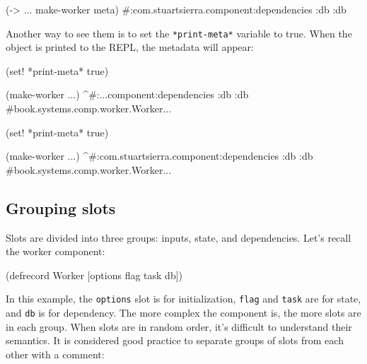 \else

\begin{english}
  \begin{clojure}
(-> {...} make-worker meta)
#:com.stuartsierra.component{:dependencies {:db :db}}
  \end{clojure}
\end{english}

\fi

Another way to see them is to set the \verb|*print-meta*| variable to true. When the object is printed to the REPL, the metadata will appear:


\ifnarrow

\begin{english}
  \begin{clojure}
(set! *print-meta* true)

(make-worker {...})
^#:...component{:dependencies {:db :db}}
#book.systems.comp.worker.Worker{...}
  \end{clojure}
\end{english}

\else

\begin{english}
  \begin{clojure}
(set! *print-meta* true)

(make-worker {...})
^#:com.stuartsierra.component{:dependencies {:db :db}}
#book.systems.comp.worker.Worker{...}
  \end{clojure}
\end{english}

\fi

\subsection{Grouping slots}


Slots are divided into three groups: inputs, state, and dependencies. Let's recall the worker component:

\begin{english}
  \begin{clojure}
(defrecord Worker
    [options flag task db])
  \end{clojure}
\end{english}

In this example, the \verb|options| slot is for initialization, \verb|flag| and \verb|task| are for state, and \verb|db| is for dependency. The more complex the component is, the more slots are in each group. When slots are in random order, it's difficult to understand their semantics. It is considered good practice to separate groups of slots from each other with a comment:

